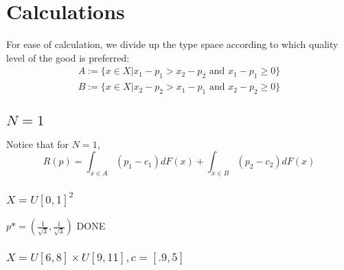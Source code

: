 \documentclass{article}
\begin{document}
\section{Calculations}

For ease of calculation, we divide up the type space according to which quality level of the good is preferred:
\begin{align}
    A := \{ x \in X | x_1 - p_1 > x_2 - p_2 \text{ and } x_1 - p_1 \geq 0 \} \\
    B := \{ x \in X | x_2 - p_2 > x_1 - p_1 \text{ and } x_2 - p_2 \geq 0 \} 
\end{align}

\subsection{$N=1$}

Notice that for $N=1$,
\begin{equation}
    R(p) = \int_{x \in A} (p_1 - c_1) dF(x) +  \int_{x \in B} (p_2 - c_2) dF(x)
\end{equation}

\subsubsection{$X=U[0,1]^2$ \autocite{pavlov2011optimal}}

{\color{red}$p* = (\frac{1}{\sqrt{3}},\frac{1}{\sqrt{3}})$ DONE}



\subsubsection{$X=U[6,8]\times U[9,11], c=[.9,5]$ \autocite{belloni2010multidimensional}}
\end{document}
